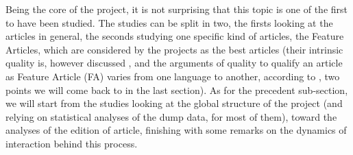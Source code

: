 Being the core of the project, it is not surprising that this topic
is one of the first to have been studied. The studies can be split
in two, the firsts looking at the articles in general, the seconds
studying one specific kind of articles, the Feature Articles, which
are considered by the projects as the best articles (their intrinsic
quality is, however discussed \citep{Lindsey10}, and the arguments
of quality to qualify an article as Feature Article (FA) varies from
one language to another, according to \citet{Stviliaetal09}, two
points we will come back to in the last section). As for the precedent
sub-section, we will start from the studies looking at the global
structure of the project (and relying on statistical analyses of the
dump data, for most of them), toward the analyses of the edition of
article, finishing with some remarks on the dynamics of interaction
behind this process.